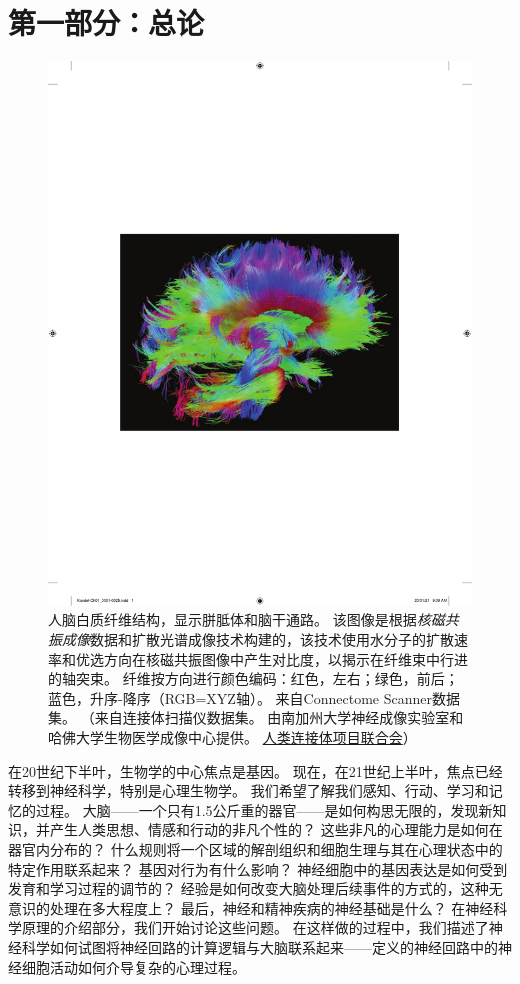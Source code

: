 \chapter*{第一部分：总论}

\begin{figure}[htbp]
	\centering
	\includegraphics[width=0.9\linewidth]{chap01/fig_1_0}
	\caption{人脑白质纤维结构，显示胼胝体和脑干通路。
		该图像是根据\textit{核磁共振成像}数据和扩散光谱成像技术构建的，该技术使用水分子的扩散速率和优选方向在核磁共振图像中产生对比度，以揭示在纤维束中行进的轴突束。
		纤维按方向进行颜色编码：红色，左右；绿色，前后；蓝色，升序-降序（RGB=XYZ轴）。
		来自Connectome Scanner数据集。
		（来自连接体扫描仪数据集。
		由南加州大学神经成像实验室和哈佛大学生物医学成像中心提供。
		\href{www.humanconnetomproject.org}{人类连接体项目联合会}）}
	\label{fig:1_0}
\end{figure}

在20世纪下半叶，生物学的中心焦点是基因。
现在，在21世纪上半叶，焦点已经转移到神经科学，特别是心理生物学。
我们希望了解我们感知、行动、学习和记忆的过程。
大脑——一个只有1.5公斤重的器官——是如何构思无限的，发现新知识，并产生人类思想、情感和行动的非凡个性的？
这些非凡的心理能力是如何在器官内分布的？
什么规则将一个区域的解剖组织和细胞生理与其在心理状态中的特定作用联系起来？
基因对行为有什么影响？
神经细胞中的基因表达是如何受到发育和学习过程的调节的？
经验是如何改变大脑处理后续事件的方式的，这种无意识的处理在多大程度上？
最后，神经和精神疾病的神经基础是什么？
在神经科学原理的介绍部分，我们开始讨论这些问题。
在这样做的过程中，我们描述了神经科学如何试图将神经回路的计算逻辑与大脑联系起来——定义的神经回路中的神经细胞活动如何介导复杂的心理过程。


